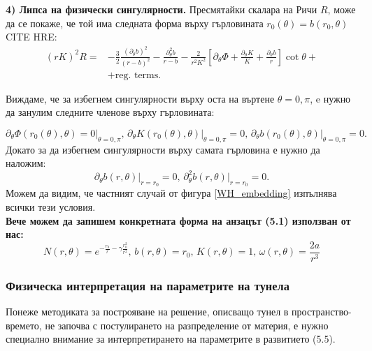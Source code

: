 \noindent\textbf{4) Липса на физически сингулярности.} Пресмятайки скалара на Ричи $R$, може да се покаже, че той има следната форма върху гърловината $r_0(\theta) = b(r_0,\theta)$ CITE HRE:
\begin{equation}
	\begin{aligned}
		(rK)^2R = &-\frac{3}{2}\frac{(\partial_\theta b)^2}{(r - b)^2} - \frac{\partial^2_\theta b}{r - b}
	- \frac{2}{r^2K^2}\left[\partial_\theta \Phi + \frac{\partial_\theta K}{K} + \frac{\partial_\theta b}{r}\right]\cot\theta + \\ 
	& + \text{reg. terms}.
	\end{aligned}
\end{equation}

\noindent Виждаме, че за избегнем сингулярности върху оста на въртене $\theta = 0,\pi$, e нужно да занулим следните членове върху гърловината:

\begin{equation}
	\partial_\theta \Phi(r_0(\theta),\theta) = 0\big\vert_{\theta = 0,\pi},\, \partial_\theta K(r_0(\theta),\theta)\big\vert_{\theta = 0,\pi} = 0,\,\partial_\theta b(r_0(\theta),\theta)\big\vert_{\theta = 0,\pi} = 0.
\end{equation}
Докато за да избегнем сингулярности върху самата гърловина е нужно да наложим:
\begin{equation}
	\partial_\theta b(r,\theta)\big\vert_{r = r_0} = 0,\, \partial^2_\theta b(r,\theta)\big\vert_{r = r_0} = 0.
\end{equation}
Можем да видим, че частният случай от фигура \ref{WH_embedding} изпълнява всички тези условия.\\

\noindent\textbf{Вече можем да запишем конкретната форма на анзацът (5.1) използван от нас:}
\begin{equation}
	N(r,\theta) = e^{-\frac{r_0}{r} - \gamma\frac{r_0^2}{r^2}},\, b(r,\theta) = r_0,\, K(r,\theta) = 1,\, \omega(r,\theta) = \frac{2a}{r^3}
\end{equation}

\subsubsection{Физическа интерпретация на параметрите на тунела}

Понеже методиката за построяване на решение, описващо тунел в пространство-времето, не започва с постулирането на разпределение от материя, е нужно специално внимание за интерпретирането на параметрите в развитието (5.5).\\

